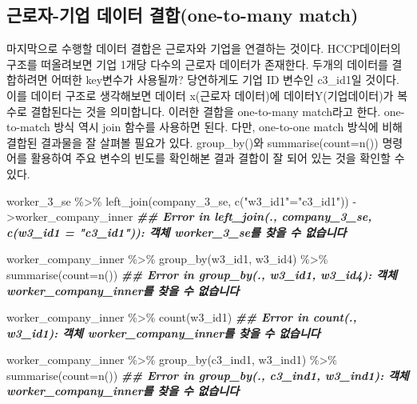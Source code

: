 \documentclass[
]{book}
\newenvironment{Shaded}{\begin{snugshade}}{\end{snugshade}}
\newcommand{\AttributeTok}[1]{\textcolor[rgb]{0.77,0.63,0.00}{#1}}
\newcommand{\DocumentationTok}[1]{\textcolor[rgb]{0.56,0.35,0.01}{\textbf{\textit{#1}}}}
\newcommand{\FunctionTok}[1]{\textcolor[rgb]{0.00,0.00,0.00}{#1}}
\newcommand{\NormalTok}[1]{#1}
\newcommand{\OtherTok}[1]{\textcolor[rgb]{0.56,0.35,0.01}{#1}}
\newcommand{\SpecialCharTok}[1]{\textcolor[rgb]{0.00,0.00,0.00}{#1}}
\newcommand{\StringTok}[1]{\textcolor[rgb]{0.31,0.60,0.02}{#1}}
\theoremstyle{definition}
\theoremstyle{definition}
\theoremstyle{definition}
\theoremstyle{definition}
\theoremstyle{remark}
\begin{document}
\hypertarget{uxadfcuxb85cuxc790-uxae30uxc5c5-uxb370uxc774uxd130-uxacb0uxd569one-to-many-match}{%
\subsection{근로자-기업 데이터 결합(one-to-many match)}\label{uxadfcuxb85cuxc790-uxae30uxc5c5-uxb370uxc774uxd130-uxacb0uxd569one-to-many-match}}

마지막으로 수행할 데이터 결합은 근로자와 기업을 연결하는 것이다. HCCP데이터의 구조를 떠올려보면 기업 1개당 다수의 근로자 데이터가 존재한다. 두개의 데이터를 결합하려면 어떠한 key변수가 사용될까? 당연하게도 기업 ID 변수인 c3\_id1일 것이다. 이를 데이터 구조로 생각해보면 데이터 x(근로자 데이터)에 데이터Y(기업데이터)가 복수로 결합된다는 것을 의미합니다. 이러한 결합을 one-to-many match라고 한다. one-to-match 방식 역시 join 함수를 사용하면 된다. 다만, one-to-one match 방식에 비해 결합된 결과물을 잘 살펴볼 필요가 있다. group\_by()와 summarise(count=n()) 명령어를 활용하여 주요 변수의 빈도를 확인해본 결과 결합이 잘 되어 있는 것을 확인할 수 있다.

\begin{Shaded}
\begin{Highlighting}[]

\NormalTok{worker\_3\_se }\SpecialCharTok{\%\textgreater{}\%}
  \FunctionTok{left\_join}\NormalTok{(company\_3\_se, }\FunctionTok{c}\NormalTok{(}\StringTok{"w3\_id1"}\OtherTok{=}\StringTok{"c3\_id1"}\NormalTok{)) }\OtherTok{{-}\textgreater{}}\NormalTok{worker\_company\_inner}
\DocumentationTok{\#\# Error in left\_join(., company\_3\_se, c(w3\_id1 = "c3\_id1")): 객체 \textquotesingle{}worker\_3\_se\textquotesingle{}를 찾을 수 없습니다}

\NormalTok{worker\_company\_inner }\SpecialCharTok{\%\textgreater{}\%} 
  \FunctionTok{group\_by}\NormalTok{(w3\_id1, w3\_id4) }\SpecialCharTok{\%\textgreater{}\%} 
  \FunctionTok{summarise}\NormalTok{(}\AttributeTok{count=}\FunctionTok{n}\NormalTok{())}
\DocumentationTok{\#\# Error in group\_by(., w3\_id1, w3\_id4): 객체 \textquotesingle{}worker\_company\_inner\textquotesingle{}를 찾을 수 없습니다}

\NormalTok{worker\_company\_inner }\SpecialCharTok{\%\textgreater{}\%} 
  \FunctionTok{count}\NormalTok{(w3\_id1)}
\DocumentationTok{\#\# Error in count(., w3\_id1): 객체 \textquotesingle{}worker\_company\_inner\textquotesingle{}를 찾을 수 없습니다}

\NormalTok{worker\_company\_inner }\SpecialCharTok{\%\textgreater{}\%} 
  \FunctionTok{group\_by}\NormalTok{(c3\_ind1, w3\_ind1) }\SpecialCharTok{\%\textgreater{}\%} 
  \FunctionTok{summarise}\NormalTok{(}\AttributeTok{count=}\FunctionTok{n}\NormalTok{())}
\DocumentationTok{\#\# Error in group\_by(., c3\_ind1, w3\_ind1): 객체 \textquotesingle{}worker\_company\_inner\textquotesingle{}를 찾을 수 없습니다}
\end{Highlighting}
\end{Shaded}
\end{document}
